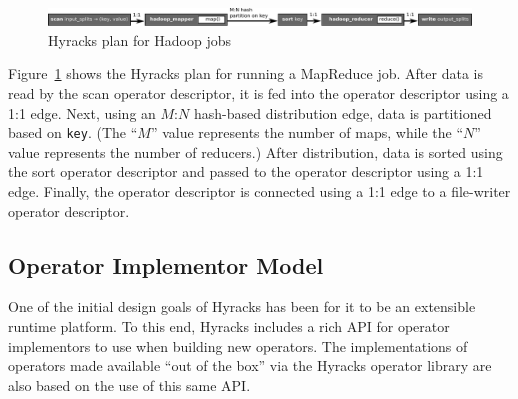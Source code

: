 \begin{figure}[!htb]
\centering
\includegraphics[scale=0.7]{images/hyrax-hadoop}
\caption{Hyracks plan for Hadoop jobs}\label{fig:hyrax-hadoop}
\end{figure}

Figure~\ref{fig:hyrax-hadoop} shows the Hyracks plan for running a MapReduce job.
After data is read by the scan operator descriptor, it is fed into the  operator descriptor using a 1:1 edge.
Next, using an $M$:$N$ hash-based distribution edge, data is partitioned based on \texttt{key}.
(The ``$M$'' value represents the number of maps, while the ``$N$'' value represents the number of reducers.)
 After distribution, data is sorted using the sort operator descriptor and passed to the  operator descriptor using a 1:1 edge.
Finally, the  operator descriptor is connected using a 1:1 edge to a file-writer operator descriptor.

\subsection{Operator Implementor Model}

One of the initial design goals of Hyracks has been for it to be an extensible runtime platform.
To this end, Hyracks includes a rich API for operator implementors to use when building new operators.
The implementations of operators made available ``out of the box'' via the Hyracks operator library are also based on the use of this same API.

